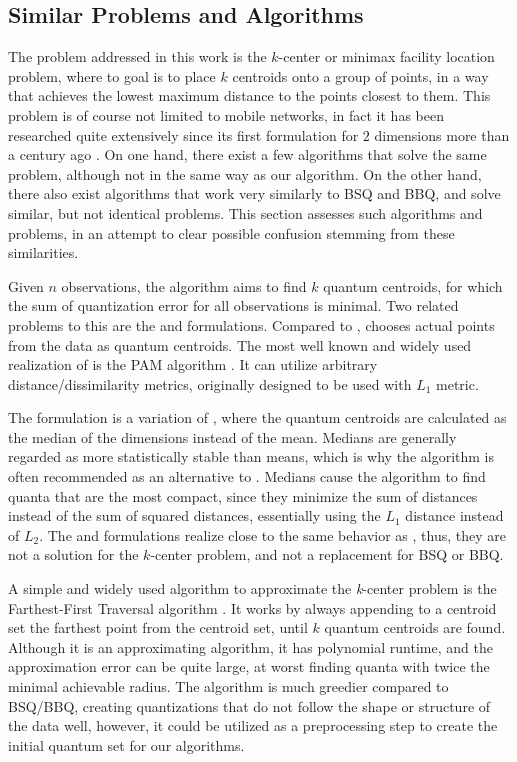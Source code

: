 		\subsection{Similar Problems and Algorithms}
			\label{cha:quantization:sec:related}
			
			The problem addressed in this work is the $k$-center or minimax facility location problem, where to goal is to place $k$ centroids onto a group of points, in a way that achieves the lowest maximum distance to the points closest to them.	
			This problem is of course not limited to mobile networks, in fact it has been researched quite extensively since its first formulation for $2$ dimensions more than a century ago \cite{farthestfirst}.
			On one hand, there exist a few algorithms that solve the same problem, although not in the same way as our algorithm.
			On the other hand, there also exist algorithms that work very similarly to \ac{BSQ} and \ac{BBQ}, and solve similar, but not identical problems.
			This section assesses such algorithms and problems, in an attempt to clear possible confusion stemming from these similarities.
			
			Given $n$ observations, the \kmeans{} algorithm aims to find $k$ quantum centroids, for which the sum of quantization error for all observations is minimal.
			Two related problems to this are the \kmedoids{} and \kmedians{} formulations.
			Compared to \kmeans{}, \kmedoids{} chooses actual points from the data as quantum centroids.
			The most well known and widely used realization of \kmedoids{} is the \ac{PAM} algorithm \cite{kaufmanbook}.
			It can utilize arbitrary distance/dissimilarity metrics, originally designed to be used with $L_1$ metric.
						
			The \kmedians{} formulation is a variation of \kmeans{}, where the quantum centroids are calculated as the median of the dimensions instead of the mean.
			Medians are generally regarded as more statistically stable than means, which is why the \kmedians{} algorithm is often recommended as an alternative to \kmeans{}.
			Medians cause the algorithm to find quanta that are the most compact, since they minimize the sum of distances instead of the sum of squared distances, essentially using the $L_1$ distance instead of $L_2$.
			The \kmedoids{} and \kmedians{} formulations realize close to the same behavior as \kmeans{}, thus, they are not a solution for the $k$-center problem, and not a replacement for \ac{BSQ} or \ac{BBQ}.
			
			A simple and widely used algorithm to approximate the \textit{k}-center problem is the Farthest-First Traversal algorithm \cite{farthestfirst}.
			It works by always appending to a centroid set the farthest point from the centroid set, until $k$ quantum centroids are found.
			Although it is an approximating algorithm, it has polynomial runtime, and the approximation error can be quite large, at worst finding quanta with twice the minimal achievable radius.
			The algorithm is much greedier compared to \ac{BSQ}/\ac{BBQ}, creating quantizations that do not follow the shape or structure of the data well, however, it could be utilized as a preprocessing step to create the initial quantum set for our algorithms.
			
